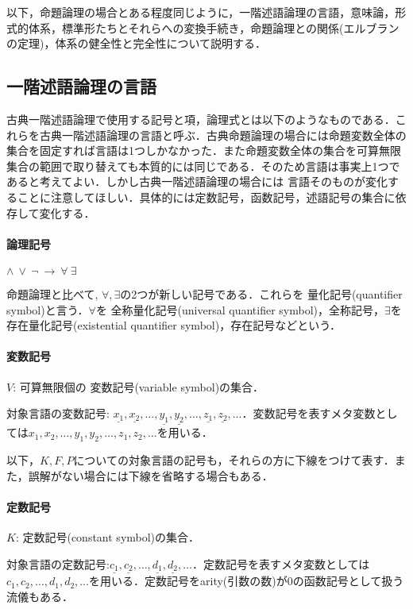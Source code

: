 \documentclass{ltjsarticle}
\theoremstyle{mystyle1}
\theoremstyle{mystyle3}
\theoremstyle{mystyle2}
\newcommand{\red}[1]{{\color{red} #1}}
\begin{document}
以下，命題論理の場合とある程度同じように，一階述語論理の言語，意味論，形式的体系，標準形たちとそれらへの変換手続き，命題論理との関係(エルブランの定理)，体系の健全性と完全性について説明する．

\subsection{一階述語論理の言語}
古典一階述語論理で使用する記号と項，論理式とは以下のようなものである．これらを古典一階述語論理の言語と呼ぶ．古典命題論理の場合には命題変数全体の集合を固定すれば言語は1つしかなかった．また命題変数全体の集合を可算無限集合の範囲で取り替えても本質的には同じである．そのため言語は事実上1つであると考えてよい．しかし古典一階述語論理の場合には\red{言語そのものが変化する}ことに注意してほしい．具体的には定数記号，函数記号，述語記号の集合に依存して変化する．

\paragraph{論理記号}
$\wedge\ \vee\ \neg\ \to\ \forall\ \exists$

命題論理と比べて, $\forall,\exists$の2つが新しい記号である．これらを\red{量化記号}(quantifier symbol)と言う．$\forall$を\red{全称量化記号}(universal quantifier symbol)，全称記号，$\exists$を\red{存在量化記号}(existential quantifier symbol)，存在記号などという．

\paragraph{変数記号}
$V$: 可算無限個の\red{変数記号}(variable symbol)の集合．

対象言語の変数記号: $\underline{x_1},\underline{x_2},\ldots,\underline{y_1},\underline{y_2},\ldots,\underline{z_1},\underline{z_2},\ldots$．変数記号を表すメタ変数としては$x_1,x_2,\ldots,y_1,y_2,\ldots,z_1,z_2,\ldots$を用いる．

以下，$K, F, P$についての対象言語の記号も，それらの方に下線をつけて表す．また，誤解がない場合には下線を省略する場合もある．

\paragraph{定数記号}
$K$: \red{定数記号}(constant symbol)の集合．

対象言語の定数記号:$\underline{c_1},\underline{c_2},\ldots,\underline{d_1},\underline{d_2},\ldots$．定数記号を表すメタ変数としては$c_1,c_2,\ldots,d_1,d_2,\ldots$を用いる．定数記号をarity(引数の数)が0の函数記号として扱う流儀もある．
\end{document}
